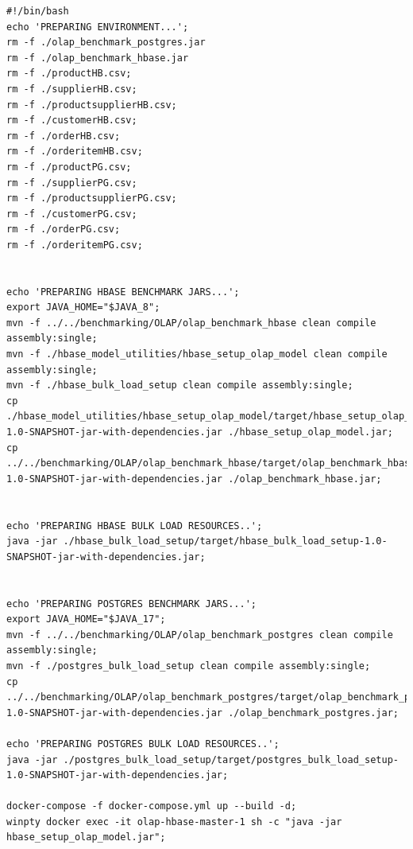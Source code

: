 \documentclass[12pt,oneside]{memoir}
\begin{document}
\begin{lstlisting}[title={prepareEnv.sh},captionpos=t]
#!/bin/bash
echo 'PREPARING ENVIRONMENT...';
rm -f ./olap_benchmark_postgres.jar
rm -f ./olap_benchmark_hbase.jar
rm -f ./productHB.csv;
rm -f ./supplierHB.csv;
rm -f ./productsupplierHB.csv;
rm -f ./customerHB.csv;
rm -f ./orderHB.csv;
rm -f ./orderitemHB.csv;
rm -f ./productPG.csv;
rm -f ./supplierPG.csv;
rm -f ./productsupplierPG.csv;
rm -f ./customerPG.csv;
rm -f ./orderPG.csv;
rm -f ./orderitemPG.csv;


echo 'PREPARING HBASE BENCHMARK JARS...';
export JAVA_HOME="$JAVA_8";
mvn -f ../../benchmarking/OLAP/olap_benchmark_hbase clean compile assembly:single;
mvn -f ./hbase_model_utilities/hbase_setup_olap_model clean compile assembly:single;
mvn -f ./hbase_bulk_load_setup clean compile assembly:single;
cp ./hbase_model_utilities/hbase_setup_olap_model/target/hbase_setup_olap_model-1.0-SNAPSHOT-jar-with-dependencies.jar ./hbase_setup_olap_model.jar;
cp ../../benchmarking/OLAP/olap_benchmark_hbase/target/olap_benchmark_hbase-1.0-SNAPSHOT-jar-with-dependencies.jar ./olap_benchmark_hbase.jar;


echo 'PREPARING HBASE BULK LOAD RESOURCES..';
java -jar ./hbase_bulk_load_setup/target/hbase_bulk_load_setup-1.0-SNAPSHOT-jar-with-dependencies.jar;


echo 'PREPARING POSTGRES BENCHMARK JARS...';
export JAVA_HOME="$JAVA_17";
mvn -f ../../benchmarking/OLAP/olap_benchmark_postgres clean compile assembly:single;
mvn -f ./postgres_bulk_load_setup clean compile assembly:single;
cp ../../benchmarking/OLAP/olap_benchmark_postgres/target/olap_benchmark_postgres-1.0-SNAPSHOT-jar-with-dependencies.jar ./olap_benchmark_postgres.jar;

echo 'PREPARING POSTGRES BULK LOAD RESOURCES..';
java -jar ./postgres_bulk_load_setup/target/postgres_bulk_load_setup-1.0-SNAPSHOT-jar-with-dependencies.jar;

docker-compose -f docker-compose.yml up --build -d;
winpty docker exec -it olap-hbase-master-1 sh -c "java -jar hbase_setup_olap_model.jar";

\end{lstlisting}


\end{document}
